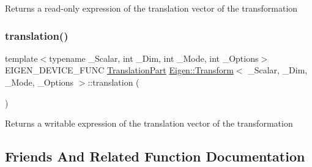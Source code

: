 \begin{DoxyReturn}{Returns}
a read-\/only expression of the translation vector of the transformation 
\end{DoxyReturn}
\mbox{\label{class_eigen_1_1_transform_ae76fc36f20276787741859cb5ebd5901}} 
\subsubsection{\texorpdfstring{translation()}{translation()}\hspace{0.1cm}{\footnotesize\ttfamily [2/2]}}
{\footnotesize\ttfamily template$<$typename \+\_\+\+Scalar, int \+\_\+\+Dim, int \+\_\+\+Mode, int \+\_\+\+Options$>$ \\
E\+I\+G\+E\+N\+\_\+\+D\+E\+V\+I\+C\+E\+\_\+\+F\+U\+NC \mbox{\hyperlink{class_eigen_1_1_transform_aabeaa2d375bf1b6b1d5cb5d1904fbd06}{Translation\+Part}} \mbox{\hyperlink{class_eigen_1_1_transform}{Eigen\+::\+Transform}}$<$ \+\_\+\+Scalar, \+\_\+\+Dim, \+\_\+\+Mode, \+\_\+\+Options $>$\+::translation (\begin{DoxyParamCaption}{ }\end{DoxyParamCaption})\hspace{0.3cm}{\ttfamily [inline]}}

\begin{DoxyReturn}{Returns}
a writable expression of the translation vector of the transformation 
\end{DoxyReturn}


\subsection{Friends And Related Function Documentation}
\mbox{\label{class_eigen_1_1_transform_a2635002f5d0f973288dace4c90d453fb}} 
